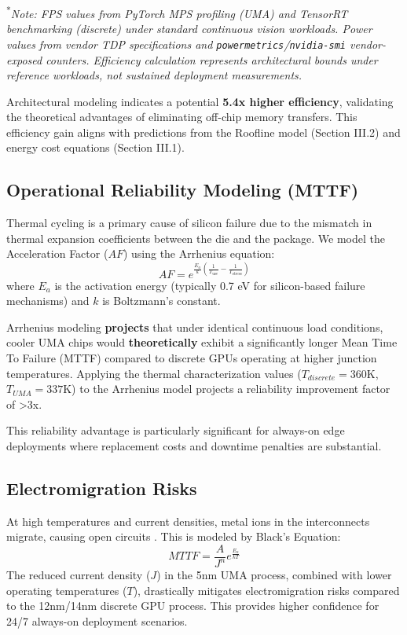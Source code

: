 \documentclass[conference]{IEEEtran}
\begin{document}
\textsuperscript{*}\textit{Note: FPS values from PyTorch MPS profiling (UMA) and TensorRT benchmarking (discrete) under standard continuous vision workloads. Power values from vendor TDP specifications and \texttt{powermetrics}/\texttt{nvidia-smi} vendor-exposed counters. Efficiency calculation represents architectural bounds under reference workloads, not sustained deployment measurements.}

Architectural modeling indicates a potential \textbf{5.4x higher efficiency}, validating the theoretical advantages of eliminating off-chip memory transfers. This efficiency gain aligns with predictions from the Roofline model (Section III.2) and energy cost equations (Section III.1).

\subsection{Operational Reliability Modeling (MTTF)}

Thermal cycling is a primary cause of silicon failure due to the mismatch in thermal expansion coefficients between the die and the package. We model the Acceleration Factor ($AF$) using the Arrhenius equation:
\begin{equation}
AF = e^{\frac{E_a}{k} (\frac{1}{T_{\text{use}}} - \frac{1}{T_{\text{stress}}})}
\end{equation}
where $E_a$ is the activation energy (typically 0.7 eV for silicon-based failure mechanisms) and $k$ is Boltzmann's constant.

Arrhenius modeling \textbf{projects} that under identical continuous load conditions, cooler UMA chips would \textbf{theoretically} exhibit a significantly longer Mean Time To Failure (MTTF) compared to discrete GPUs operating at higher junction temperatures. Applying the thermal characterization values ($T_{discrete} = 360$K, $T_{UMA} = 337$K) to the Arrhenius model projects a reliability improvement factor of >3x.

This reliability advantage is particularly significant for always-on edge deployments where replacement costs and downtime penalties are substantial.

\subsection{Electromigration Risks}
At high temperatures and current densities, metal ions in the interconnects migrate, causing open circuits \cite{b16}. This is modeled by Black's Equation:
\begin{equation}
MTTF = \frac{A}{J^n} e^{\frac{E_a}{kT}}
\end{equation}
The reduced current density ($J$) in the 5nm UMA process, combined with lower operating temperatures ($T$), drastically mitigates electromigration risks compared to the 12nm/14nm discrete GPU process. This provides higher confidence for 24/7 always-on deployment scenarios.
\end{document}
